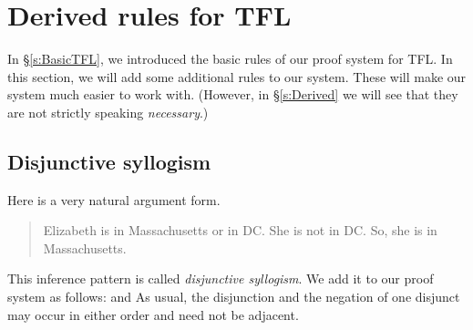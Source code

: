 \chapter{Derived rules for TFL}\label{s:Further}
In \S\ref{s:BasicTFL}, we introduced the basic rules of our proof system for TFL. In this section, we will add some additional rules to our system. These will make our system much easier to work with. (However, in \S\ref{s:Derived} we will see that they are not strictly speaking \emph{necessary}.)

%

\section{Disjunctive syllogism}
Here is a very natural argument form.
	\begin{quote}
		Elizabeth is in Massachusetts or in DC. She is not in DC. So, she is in Massachusetts.
	\end{quote}
This inference pattern is called \emph{disjunctive syllogism}. We add it to our proof system as follows:
and
As usual, the disjunction and the negation of one disjunct may occur in either order and need not be adjacent.

